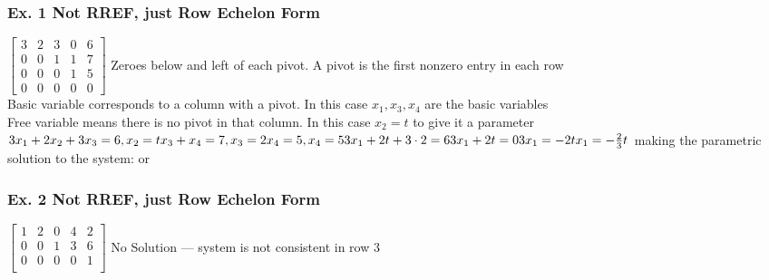 \documentclass{article}
\begin{document}
\subsubsection*{Ex. 1 Not RREF, just Row Echelon Form}
$
\left[\begin{array}{cccc|c}
3 & 2 & 3 & 0 & 6 \\
0 & 0 & 1 & 1 & 7 \\
0 & 0 & 0 & 1 & 5 \\
0 & 0 & 0 & 0 & 0 
\end{array}\right]
$ Zeroes below and left of each pivot. A pivot is the first nonzero entry in each row\\[0.05in] 
Basic variable corresponds to a column with a pivot. In this case $x_1, x_3, x_4$ are the basic variables
\\Free variable means there is no pivot in that column. In this case $x_2 = t$ to give it a parameter\\
$3x_1+2x_2+3x_3=6, x_2 = t \\ x_3+x_4=7, x_3=2 \\ x_4 = 5, x_4=5 \\ 3x_1+2t+3\cdot 2 = 6 \\ 3x_1+2t=0\\ 3x_1=-2t\\ x_1=-\frac{2}{3}t$ making the parametric solution to the system:
 or 

\subsubsection*{Ex. 2 Not RREF, just Row Echelon Form}
$\left[\begin{array}{cccc|c}
1 & 2 & 0 & 4 & 2 \\
0 & 0 & 1 & 3 & 6 \\
0 & 0 & 0 & 0 & 1 \\
\end{array}\right]$ No Solution — system is not consistent in row 3\\[0.05in]
\end{document}
